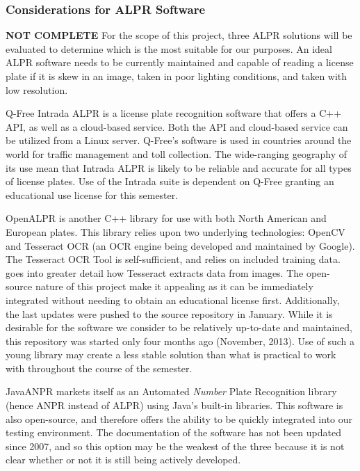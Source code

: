 \documentclass[11pt, oneside, fullpage, doublespace]{article}
\begin{document}
\subsubsection{Considerations for ALPR Software}
{\color{red}\textbf{NOT COMPLETE}}
For the scope of this project, three ALPR solutions will be evaluated to determine which is the most suitable for our purposes. An ideal ALPR software needs to be currently maintained and capable of reading a license plate if it is skew in an image, taken in poor lighting conditions, and taken with low resolution.

Q-Free Intrada ALPR \cite{intrada2014} is a license plate recognition software that offers a C++ API, as well as a cloud-based service. Both the API and cloud-based service can be utilized from a Linux server. Q-Free's software is used in countries around the world for traffic management and toll collection. The wide-ranging geography of its use mean that Intrada ALPR is likely to be reliable and accurate for all types of license plates. Use of the Intrada suite is dependent on Q-Free granting an educational use license for this semester.

OpenALPR is another C++ library for use with both North American and European plates. This library relies upon two underlying technologies: OpenCV \cite{openCV} and Tesseract OCR (an OCR engine being developed and maintained by Google). The Tesseract OCR Tool is self-sufficient, and relies on included training data. \cite{patel2012} goes into greater detail how Tesseract extracts data from images. The open-source nature of this project make it appealing as it can be immediately integrated without needing to obtain an educational license first. Additionally, the last updates were pushed to the source repository in January. While it is desirable for the software we consider to be relatively up-to-date and maintained, this repository was started only four months ago (November, 2013). Use of such a young library may create a less stable solution than what is practical to work with throughout the course of the semester.

JavaANPR markets itself as an Automated \emph{Number} Plate Recognition library (hence ANPR instead of ALPR) using Java's built-in libraries. This software is also open-source, and therefore offers the ability to be quickly integrated into our testing environment. The documentation of the software has not been updated since 2007, and so this option may be the weakest of the three because it is not clear whether or not it is still being actively developed.
\end{document}
